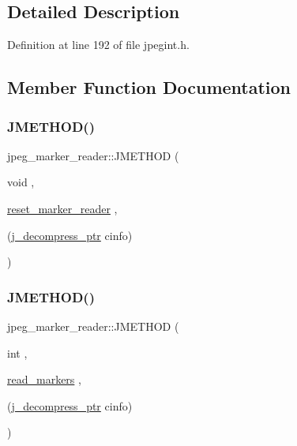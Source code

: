 \subsection{Detailed Description}


Definition at line 192 of file jpegint.\+h.



\subsection{Member Function Documentation}
\mbox{\label{structjpeg__marker__reader_af23250da87f9da190c88459aa565f2b1}} 
\subsubsection{\texorpdfstring{JMETHOD()}{JMETHOD()}\hspace{0.1cm}{\footnotesize\ttfamily [1/2]}}
{\footnotesize\ttfamily jpeg\+\_\+marker\+\_\+reader\+::\+J\+M\+E\+T\+H\+OD (\begin{DoxyParamCaption}\item[{void}]{,  }\item[{\mbox{\hyperlink{jdmarker_8c_a1c08f1ba460e1a19d2dbc877b47c8b5f}{reset\+\_\+marker\+\_\+reader}}}]{,  }\item[{(\mbox{\hyperlink{jpeglib_8h_a00c7d78af44bd26a901c791ccfc1e178}{j\+\_\+decompress\+\_\+ptr}} cinfo)}]{ }\end{DoxyParamCaption})}

\mbox{\label{structjpeg__marker__reader_a6a2541cbeb37477c71ba6bc237e559a1}} 
\subsubsection{\texorpdfstring{JMETHOD()}{JMETHOD()}\hspace{0.1cm}{\footnotesize\ttfamily [2/2]}}
{\footnotesize\ttfamily jpeg\+\_\+marker\+\_\+reader\+::\+J\+M\+E\+T\+H\+OD (\begin{DoxyParamCaption}\item[{int}]{,  }\item[{\mbox{\hyperlink{jdmarker_8c_a8ff81a078a99e98efe6051366512c5f6}{read\+\_\+markers}}}]{,  }\item[{(\mbox{\hyperlink{jpeglib_8h_a00c7d78af44bd26a901c791ccfc1e178}{j\+\_\+decompress\+\_\+ptr}} cinfo)}]{ }\end{DoxyParamCaption})}



